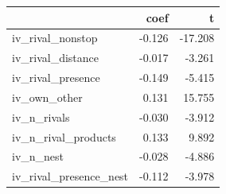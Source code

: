 \begin{tabular}{lrr}
\toprule
 & coef & t \\
\midrule
iv\_rival\_nonstop & -0.126 & -17.208 \\
iv\_rival\_distance & -0.017 & -3.261 \\
iv\_rival\_presence & -0.149 & -5.415 \\
iv\_own\_other & 0.131 & 15.755 \\
iv\_n\_rivals & -0.030 & -3.912 \\
iv\_n\_rival\_products & 0.133 & 9.892 \\
iv\_n\_nest & -0.028 & -4.886 \\
iv\_rival\_presence\_nest & -0.112 & -3.978 \\
\bottomrule
\end{tabular}
\par\vspace{2pt}{\footnotesize Dependent variable: price (\$100). Route, quarter and carrier fixed effects; route-clustered t statistics.}
